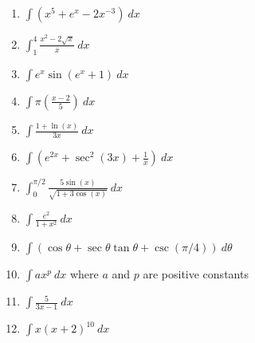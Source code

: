 \documentclass[12pt]{article}
\renewcommand{\emph}[1]{\textsf{\textbf{#1}}}
\newcounter{probcount}
\newcounter{subprobcount}
\newenvironment{subproblems}{%
\begin{enumerate}%
\setcounter{enumi}{\value{subprobcount}}%
\renewcommand{\theenumi}{\emph{\alph{enumi}}}}%
{\setcounter{subprobcount}{\value{enumi}}\end{enumerate}}
\newcommand{\ds}{\displaystyle}
\begin{document}
\begin{subproblems}


\item   $\ds \int (x^5 + e^x - 2x^{-3}) \: dx$\\
\vfill

\item $\ds \int_1^4 \frac{x^2 - 2\sqrt{x}}{x} \: dx$\\
\vfill

\item   $\ds \int e^x\sin(e^x+1) \: dx$ \\
\vfill

\newpage
\item   $\ds \int \pi\left(\frac{x-2}{5}\right) \: dx$\\
\vfill

\item   $\ds \int \frac{1+\ln(x)}{3x} \: dx$
\vfill

\item   $\ds \int \left(e^{2x} + \sec^2(3x) + \frac{1}{x} \right) \: dx$ \\
\vfill

\newpage

\item   $\ds \int_0^{\pi/2} \frac{5 \sin(x)}{\sqrt{1+3\cos(x)}}\: dx$
\vfill

\item   $\ds \int \frac{e^2}{1+x^2} \: dx$\\
\vfill

\item   $\ds \int \left(\cos \theta + \sec \theta \tan \theta  + \csc(\pi/4)\right) \: d\theta$\\
\vfill

\newpage



\item   $\ds \int ax^p \: dx$ \hspace{.1in}   where $a$ and $p$ are positive constants

\vfill

\item   $\ds \int  \frac{5}{3x-1} \: dx$
\vfill

\item   $\ds \int x(x+2)^{10}\: dx$\\
\vfill

\end{subproblems}
\end{document}
